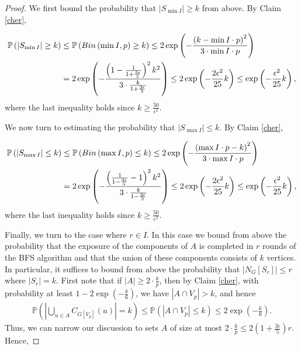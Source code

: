 \documentclass[10pt,a4paper]{amsart}
\begin{document}
\begin{proof}
    We first bound the probability that $|S_{\min I}|\ge k$ from above. By Claim \ref{cher},
    
    \begin{align}\label{start}
    \notag
    \mathbb{P}\left(|S_{\min I}|\ge k\right)&\le\mathbb{P}\left(Bin\left(\min I,p\right)\ge k\right)\le 2\exp\left(-\frac{\left(k-\min I\cdot p\right)^2}{3\cdot \min I\cdot p}\right)\\
    &=2\exp\left(-\frac{\left(1-\frac{1}{1+\frac{3\epsilon}{5}}\right)^2k^2}{3\cdot \frac{k}{1+\frac{3\epsilon}{5}}}\right)\le 2\exp\left(-\frac{2\epsilon^2}{25}k\right)\le \exp\left(-\frac{\epsilon^2}{25}k\right),
    \end{align}
    where the last inequality holds since $k\ge \frac{50}{\epsilon^2}$.

    We now turn to estimating the probability that $|S_{\max I}|\le k$. By Claim \ref{cher},
    
    \begin{align}\label{end}
    \notag
    \mathbb{P}\left(|S_{\max I}|\le k\right)&\le\mathbb{P}\left(Bin\left(\max I,p\right)\le k\right)\le 2\exp\left(-\frac{\left(\max I\cdot p-k\right)^2}{3\cdot \max I\cdot p}\right)\\
    &=2\exp\left(-\frac{\left(\frac{1}{1-\frac{3\epsilon}{5}}-1\right)^2k^2}{3\cdot \frac{k}{1-\frac{3\epsilon}{5}}}\right)\le 2\exp\left(-\frac{2\epsilon^2}{25}k\right)\le \exp\left(-\frac{\epsilon^2}{25}k\right),
    \end{align}
    where the last inequality holds since $k\ge \frac{50}{\epsilon^2}$. 
    
    Finally, we turn to the case where $r\in I$. In this case we bound from above the probability that the exposure of the components of $A$ is completed in $r$ rounds of the BFS algorithm and that the union of these components consists of $k$ vertices. In particular, it suffices to bound from above the probability that $|N_G[S_r]|\le r$ where $|S_r|=k$. First note that if $|A|\ge 2\cdot \frac{k}{p}$, then by Claim \ref{cher}, with probability at least $1-2\exp\left(-\frac{k}{6}\right)$, we have $|A\cap V_p|>k$, and hence 
    \begin{align*}
        \mathbb{P}\left(\left|\bigcup_{u\in A} C_{G[V_p]}(u)\right|=k\right)\le \mathbb{P}\left(|A\cap V_p|\le k\right)\le 2\exp\left(-\frac{k}{6}\right).
    \end{align*}
    Thus, we can narrow our discussion to sets $A$ of size at most $2\cdot \frac{k}{p}\le 2\left(1+\frac{3\epsilon}{5}\right)r$. Hence,


\end{proof}
\end{document}
